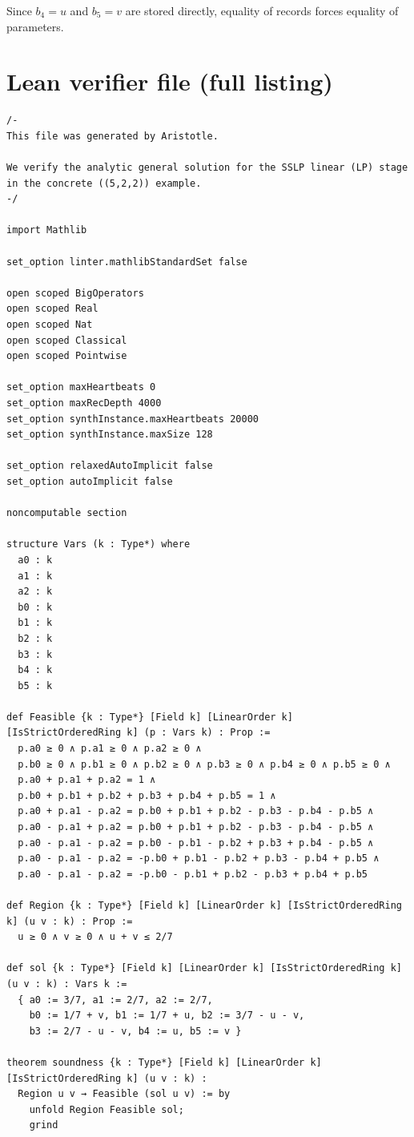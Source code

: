 \documentclass[11pt]{article}
\begin{document}
Since $b_4=u$ and $b_5=v$ are stored directly, equality of records forces equality of parameters.

\appendix
\section{Lean verifier file (full listing)}

\begin{lstlisting}
/-
This file was generated by Aristotle.

We verify the analytic general solution for the SSLP linear (LP) stage in the concrete ((5,2,2)) example.
-/

import Mathlib

set_option linter.mathlibStandardSet false

open scoped BigOperators
open scoped Real
open scoped Nat
open scoped Classical
open scoped Pointwise

set_option maxHeartbeats 0
set_option maxRecDepth 4000
set_option synthInstance.maxHeartbeats 20000
set_option synthInstance.maxSize 128

set_option relaxedAutoImplicit false
set_option autoImplicit false

noncomputable section

structure Vars (k : Type*) where
  a0 : k
  a1 : k
  a2 : k
  b0 : k
  b1 : k
  b2 : k
  b3 : k
  b4 : k
  b5 : k

def Feasible {k : Type*} [Field k] [LinearOrder k] [IsStrictOrderedRing k] (p : Vars k) : Prop :=
  p.a0 ≥ 0 ∧ p.a1 ≥ 0 ∧ p.a2 ≥ 0 ∧
  p.b0 ≥ 0 ∧ p.b1 ≥ 0 ∧ p.b2 ≥ 0 ∧ p.b3 ≥ 0 ∧ p.b4 ≥ 0 ∧ p.b5 ≥ 0 ∧
  p.a0 + p.a1 + p.a2 = 1 ∧
  p.b0 + p.b1 + p.b2 + p.b3 + p.b4 + p.b5 = 1 ∧
  p.a0 + p.a1 - p.a2 = p.b0 + p.b1 + p.b2 - p.b3 - p.b4 - p.b5 ∧
  p.a0 - p.a1 + p.a2 = p.b0 + p.b1 + p.b2 - p.b3 - p.b4 - p.b5 ∧
  p.a0 - p.a1 - p.a2 = p.b0 - p.b1 - p.b2 + p.b3 + p.b4 - p.b5 ∧
  p.a0 - p.a1 - p.a2 = -p.b0 + p.b1 - p.b2 + p.b3 - p.b4 + p.b5 ∧
  p.a0 - p.a1 - p.a2 = -p.b0 - p.b1 + p.b2 - p.b3 + p.b4 + p.b5

def Region {k : Type*} [Field k] [LinearOrder k] [IsStrictOrderedRing k] (u v : k) : Prop :=
  u ≥ 0 ∧ v ≥ 0 ∧ u + v ≤ 2/7

def sol {k : Type*} [Field k] [LinearOrder k] [IsStrictOrderedRing k] (u v : k) : Vars k :=
  { a0 := 3/7, a1 := 2/7, a2 := 2/7,
    b0 := 1/7 + v, b1 := 1/7 + u, b2 := 3/7 - u - v,
    b3 := 2/7 - u - v, b4 := u, b5 := v }

theorem soundness {k : Type*} [Field k] [LinearOrder k] [IsStrictOrderedRing k] (u v : k) :
  Region u v → Feasible (sol u v) := by
    unfold Region Feasible sol;
    grind


\end{lstlisting}
\end{document}
